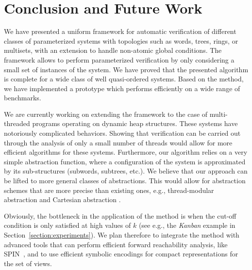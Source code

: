 \section{Conclusion and Future Work}
\label{section:conclusion}
We have  presented a uniform framework
for automatic verification of 
different classes of parameterized systems
with topologies such as words, trees, rings, or
multisets, with an extension to handle non-atomic global conditions.
%
The framework allows to perform parameterized verification by
only considering a small set of instances of the system.
%
We have proved that the presented algorithm is complete for a wide
class of well quasi-ordered systems.
%
Based on the method, we have implemented a prototype which performs
efficiently on a wide range of benchmarks.
%

We are currently working on extending the framework to the case of
multi-threaded programs operating on dynamic heap structures.
%
These systems have notoriously complicated behaviors.
%
Showing that verification can be carried out
through the analysis of only a small number of threads
would allow for more efficient algorithms for these systems.
%
Furthermore,
our algorithm relies on a very simple abstraction function, 
where a configuration of the system is approximated by its
sub-structures (subwords, subtrees, etc.).
%
We believe
that our approach can be lifted to more general classes
of abstractions.
%
This would allow for abstraction schemes that are more
precise than existing ones, e.g.,
 thread-modular abstraction \cite{ThreadModular}
and 
Cartesian abstraction \cite{TMisCA}.
%

Obviously, the bottleneck in the application
of the method is when the cut-off condition is only satisfied at high
values of
$k$ (see e.g., the {\it Kanban} example in
Section~\ref{section:experiments}).
%
We plan therefore to integrate the method with advanced 
tools that can perform efficient forward reachability analysis, like
SPIN~\cite{SPINModelChecker}, and to use efficient
symbolic encodings for compact representations for the set of views.
